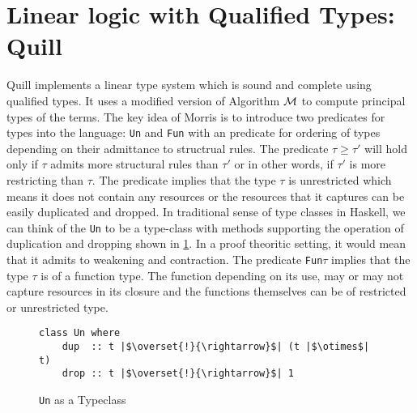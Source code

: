 \section{Linear logic with Qualified Types: Quill}\label{sec:quill}
Quill \citep{morris_best_2016} implements a linear type system which is sound and complete using qualified types.
It uses a modified version of Algorithm $\mathcal{M}$ to compute principal types of the terms.
The key idea of Morris is to introduce two predicates for types into the language: \texttt{Un} and \texttt{Fun} with an predicate for ordering
of types depending on their admittance to structrual rules. The predicate $\tau \geq \tau'$ will hold only if $\tau$ admits more
structural rules than $\tau'$ or in other words, if $\tau'$ is more restricting than $\tau$.
The predicate \Un{$\tau$} implies that the type $\tau$ is unrestricted which means it does not
contain any resources or the resources that it captures can be easily duplicated and dropped.
In traditional sense of type classes in Haskell, we can think of the \texttt{Un} to be a type-class with methods supporting the operation
of duplication and dropping shown in \cref{fig:un-typeclass}. In a proof theoritic setting, it would mean
that it admits to weakening and contraction. The predicate \texttt{Fun$\tau$} implies that the type $\tau$ is of a function type. The function
depending on its use, may or may not capture resources in its closure and the functions
themselves can be of restricted or unrestricted type.
\begin{figure}[h]
  \begin{framed}\centering
    \begin{verbatim}
class Un where
    dup  :: t |$\overset{!}{\rightarrow}$| (t |$\otimes$| t)
    drop :: t |$\overset{!}{\rightarrow}$| 1
    \end{verbatim}
  \end{framed}
  \caption{\texttt{Un} as a Typeclass}
  \label{fig:un-typeclass}
\end{figure}

